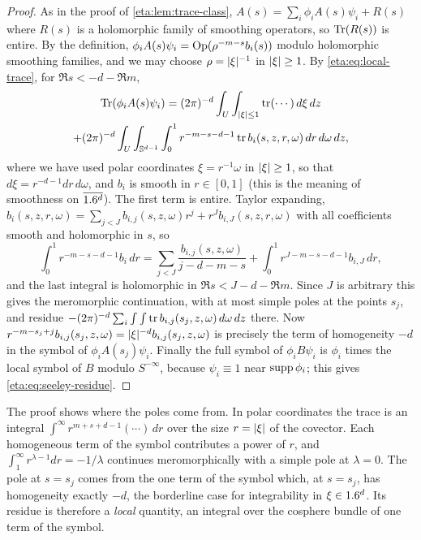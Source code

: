 \begin{proof} As in the proof of \cref{eta:lem:trace-class},
$A(s)=\sum_i\phi_iA(s)\psi_i+R(s)$ where $R(s)$ is a holomorphic family of
smoothing operators, so $\operatorname{Tr}(R(s))$ is entire. By the definition, $\phi_iA(s)\psi_i
=\operatorname{Op}(\rho^{-m-s}b_i(s))$ modulo holomorphic smoothing families, and we may choose
$\rho=\lvert \xi\rvert^{-1}$ in $\lvert \xi\rvert\ge1$. By \eqref{eta:eq:local-trace}, for
$\Re s<-d-\Re m$,
\begin{multline*}
\operatorname{Tr}(\phi_iA(s)\psi_i)=(2\pi)^{-d}\int_U\int_{\lvert \xi\rvert\le1}\operatorname{tr}(\cdots)\,d\xi\,dz\\
+(2\pi)^{-d}\int_U\int_{\mathbb{S}^{d-1}}\int_0^1 r^{-m-s-d-1}\operatorname{tr} b_i(s,z,r,\omega)\,
dr\,d\omega\,dz,
\end{multline*}
where we have used polar coordinates $\xi=r^{-1}\omega$ in $\lvert \xi\rvert\ge1$, so that
$d\xi=r^{-d-1}dr\,d\omega$, and $b_i$ is smooth in $r\in[0,1]$ (this is the meaning of
smoothness on $\overline{1.6^d}$). The first term is entire. Taylor expanding,
$b_i(s,z,r,\omega)=\sum_{j<J}b_{i,j}(s,z,\omega)r^j+r^Jb_{i,J}(s,z,r,\omega)$ with all
coefficients smooth and holomorphic in $s$, so
\[
\int_0^1r^{-m-s-d-1}b_i\,dr=\sum_{j<J}\frac{b_{i,j}(s,z,\omega)}{j-d-m-s}
+\int_0^1r^{J-m-s-d-1}b_{i,J}\,dr,
\]
and the last integral is holomorphic in $\Re s<J-d-\Re m$. Since $J$ is arbitrary
this gives the meromorphic continuation, with at most simple poles at the points
$s_j$, and residue $-(2\pi)^{-d}\sum_i\int\int\operatorname{tr} b_{i,j}(s_j,z,\omega)\,d\omega\,dz$
there. Now $r^{-m-s_j+j}b_{i,j}(s_j,z,\omega)=\lvert \xi\rvert^{-d}b_{i,j}(s_j,z,\omega)$ is
precisely the term of homogeneity $-d$ in the symbol of $\phi_iA(s_j)\psi_i$. Finally
the full symbol of $\phi_iB\psi_i$ is $\phi_i$ times the local symbol of $B$ modulo
$S^{-\infty}$, because $\psi_i\equiv1$ near $\operatorname{supp}\phi_i$; this gives
\eqref{eta:eq:seeley-residue}.
\end{proof}

\begin{discussion}
  The proof shows where the poles come from. In polar coordinates the trace is an
  integral $\int^\infty r^{m+s+d-1}(\cdots)\,dr$ over the size $r=\lvert \xi\rvert$ of the
  covector. Each homogeneous term of the symbol contributes a power of $r$, and
  $\int_1^\infty r^{\lambda-1}dr=-1/\lambda$ continues meromorphically with a
  simple pole at $\lambda=0$. The pole at $s=s_j$ comes from the one term of the
  symbol which, at $s=s_j$, has homogeneity exactly $-d$, the borderline case
  for integrability in $\xi\in1.6^d$. Its residue is therefore a \emph{local}
  quantity, an integral over the cosphere bundle of one term of the symbol.
\end{discussion}


